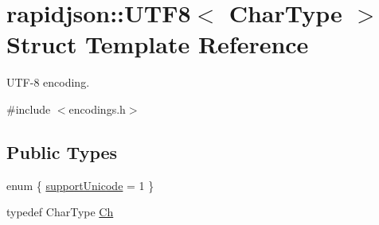 \hypertarget{structrapidjson_1_1_u_t_f8}{}\section{rapidjson\+::U\+T\+F8$<$ Char\+Type $>$ Struct Template Reference}
\label{structrapidjson_1_1_u_t_f8}


U\+T\+F-\/8 encoding.  




{\ttfamily \#include $<$encodings.\+h$>$}

\subsection*{Public Types}
\begin{DoxyCompactItemize}
\item 
enum \{ \mbox{\hyperlink{structrapidjson_1_1_u_t_f8_a162ec39d1feea956ac7c82ee21bbe037a821cba43661b67d78115cc9366e91b32}{support\+Unicode}} = 1
 \}
\item 
typedef Char\+Type \mbox{\hyperlink{structrapidjson_1_1_u_t_f8_a9f47e775d8306a647a5c9eceac4b52fc}{Ch}}
\end{DoxyCompactItemize}
